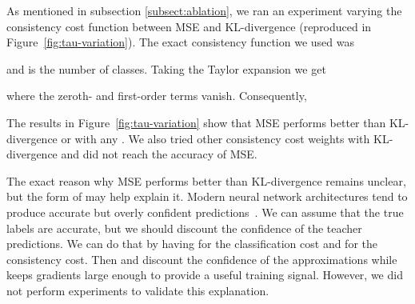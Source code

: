 \documentclass{article}
\begin{document}
As mentioned in subsection \ref{subsect:ablation}, we ran an experiment varying the consistency cost function between MSE and KL-divergence (reproduced in Figure~\ref{fig:tau-variation}).
The exact consistency function we used was 



 and  is the number of classes. Taking the Taylor expansion we get



where the zeroth- and first-order terms vanish. Consequently, 



The results in Figure~\ref{fig:tau-variation} show that MSE performs better than KL-divergence or  with any .
We also tried other consistency cost weights with KL-divergence and did not reach the accuracy of MSE.

The exact reason why MSE performs better than KL-divergence remains unclear, but the form of  may help explain it.
Modern neural network architectures tend to produce accurate but overly confident predictions~\citep{guo_calibration_2017}.
We can assume that the true labels are accurate, but we should discount the confidence of the teacher predictions.
We can do that by having  for the classification cost and  for the consistency cost.
Then  and  discount the confidence of the approximations while  keeps gradients large enough to provide a useful training signal.
However, we did not perform experiments to validate this explanation.
\end{document}
